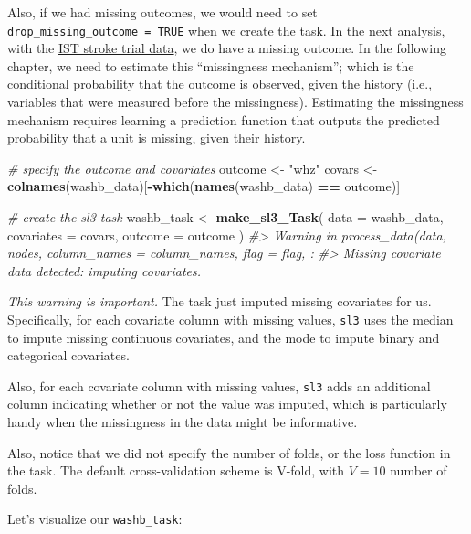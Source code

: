 \documentclass[12pt, krantz2,]{book}
\newenvironment{Shaded}{\begin{snugshade}}{\end{snugshade}}
\newcommand{\CommentTok}[1]{\textcolor[rgb]{0.56,0.35,0.01}{\textit{#1}}}
\newcommand{\DataTypeTok}[1]{\textcolor[rgb]{0.13,0.29,0.53}{#1}}
\newcommand{\KeywordTok}[1]{\textcolor[rgb]{0.13,0.29,0.53}{\textbf{#1}}}
\newcommand{\NormalTok}[1]{#1}
\newcommand{\OperatorTok}[1]{\textcolor[rgb]{0.81,0.36,0.00}{\textbf{#1}}}
\newcommand{\StringTok}[1]{\textcolor[rgb]{0.31,0.60,0.02}{#1}}
\theoremstyle{definition}
\theoremstyle{definition}
\theoremstyle{definition}
\newcommand{\1}{\mathbbm{1}}
\begin{document}
Also, if we had missing outcomes, we would need to set \texttt{drop\_missing\_outcome\ =\ TRUE} when we create the task. In the next analysis, with the \protect\hyperlink{ist}{IST stroke trial
data}, we do have a missing outcome. In the following chapter, we need to
estimate this ``missingness mechanism''; which is the conditional probability that
the outcome is observed, given the history (i.e., variables that were measured
before the missingness). Estimating the missingness mechanism requires learning
a prediction function that outputs the predicted probability that a unit is
missing, given their history.

\begin{Shaded}
\begin{Highlighting}[]
\CommentTok{# specify the outcome and covariates}
\NormalTok{outcome <-}\StringTok{ "whz"}
\NormalTok{covars <-}\StringTok{ }\KeywordTok{colnames}\NormalTok{(washb_data)[}\OperatorTok{-}\KeywordTok{which}\NormalTok{(}\KeywordTok{names}\NormalTok{(washb_data) }\OperatorTok{==}\StringTok{ }\NormalTok{outcome)]}

\CommentTok{# create the sl3 task}
\NormalTok{washb_task <-}\StringTok{ }\KeywordTok{make_sl3_Task}\NormalTok{(}
  \DataTypeTok{data =}\NormalTok{ washb_data,}
  \DataTypeTok{covariates =}\NormalTok{ covars,}
  \DataTypeTok{outcome =}\NormalTok{ outcome}
\NormalTok{)}
\CommentTok{#> Warning in process_data(data, nodes, column_names = column_names, flag = flag, :}
\CommentTok{#> Missing covariate data detected: imputing covariates.}
\end{Highlighting}
\end{Shaded}

\emph{This warning is important.} The task just imputed missing covariates for us.
Specifically, for each covariate column with missing values, \texttt{sl3} uses the
median to impute missing continuous covariates, and the mode to impute binary
and categorical covariates.

Also, for each covariate column with missing values, \texttt{sl3} adds an additional
column indicating whether or not the value was imputed, which is particularly
handy when the missingness in the data might be informative.

Also, notice that we did not specify the number of folds, or the loss function
in the task. The default cross-validation scheme is V-fold, with \(V=10\) number
of folds.

Let's visualize our \texttt{washb\_task}:
\end{document}
